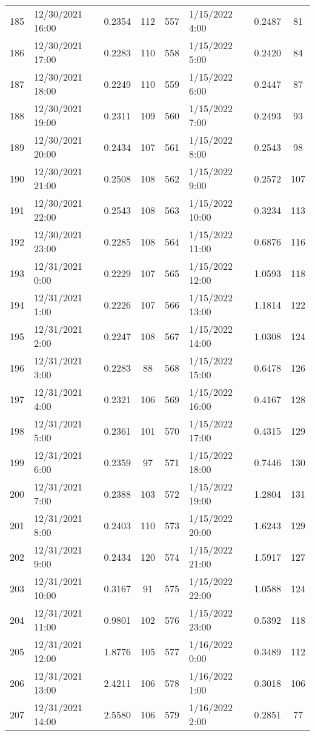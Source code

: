 \begin{center}
\begin{longtable}{llccllcc}
    185&12/30/2021 16:00&0.2354&112&557&1/15/2022 4:00	    &0.2487&81  \\
    186&12/30/2021 17:00&0.2283&110&558&1/15/2022 5:00	    &0.2420&84  \\
    187&12/30/2021 18:00&0.2249&110&559&1/15/2022 6:00	    &0.2447&87  \\
    188&12/30/2021 19:00&0.2311&109&560&1/15/2022 7:00	    &0.2493&93  \\
    189&12/30/2021 20:00&0.2434&107&561&1/15/2022 8:00	    &0.2543&98  \\
    190&12/30/2021 21:00&0.2508&108&562&1/15/2022 9:00	    &0.2572&107 \\
    191&12/30/2021 22:00&0.2543&108&563&1/15/2022 10:00	    &0.3234&113 \\
    192&12/30/2021 23:00&0.2285&108&564&1/15/2022 11:00	    &0.6876&116 \\
    193&12/31/2021 0:00	   &0.2229&107&565&1/15/2022 12:00	    &1.0593&118 \\
    194&12/31/2021 1:00	   &0.2226&107&566&1/15/2022 13:00	    &1.1814&122 \\
    195&12/31/2021 2:00	   &0.2247&108&567&1/15/2022 14:00	    &1.0308&124 \\
    196&12/31/2021 3:00	   &0.2283&88 &568&1/15/2022 15:00	    &0.6478&126 \\
    197&12/31/2021 4:00	   &0.2321&106&569&1/15/2022 16:00	    &0.4167&128 \\
    198&12/31/2021 5:00	   &0.2361&101&570&1/15/2022 17:00	    &0.4315&129 \\
    199&12/31/2021 6:00	   &0.2359&97 &571&1/15/2022 18:00	    &0.7446&130 \\
    200&12/31/2021 7:00	   &0.2388&103&572&1/15/2022 19:00	    &1.2804&131 \\
    201&12/31/2021 8:00	   &0.2403&110&573&1/15/2022 20:00	    &1.6243&129 \\
    202&12/31/2021 9:00	   &0.2434&120&574&1/15/2022 21:00	    &1.5917&127 \\
    203&12/31/2021 10:00   &0.3167&91 &575&1/15/2022 22:00	    &1.0588&124 \\
    204&12/31/2021 11:00   &0.9801&102&576&1/15/2022 23:00	    &0.5392&118 \\
    205&12/31/2021 12:00   &1.8776&105&577&1/16/2022 0:00	    &0.3489&112 \\
    206&12/31/2021 13:00   &2.4211&106&578&1/16/2022 1:00	    &0.3018&106 \\
    207&12/31/2021 14:00   &2.5580&106&579&1/16/2022 2:00	    &0.2851&77  \\

\end{longtable}
\end{center}
